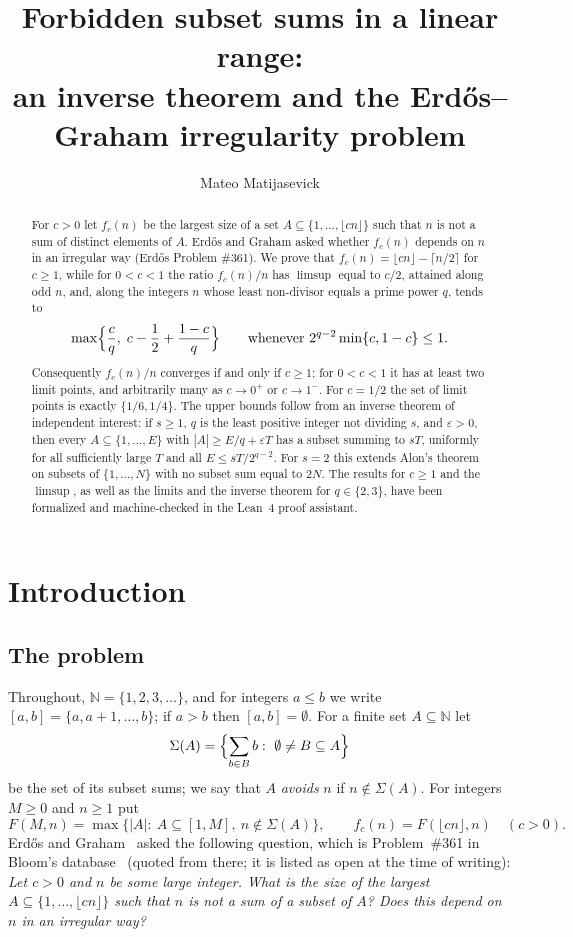 \documentclass[11pt,reqno]{amsart}
\title[Forbidden subset sums in a linear range]{Forbidden subset sums in a linear range:\\ an inverse theorem and the Erd\H{o}s--Graham irregularity problem}
\author{Mateo Matijasevick}
\date{}
\numberwithin{equation}{section}
\theoremstyle{definition}
\theoremstyle{remark}
\newcommand{\N}{\mathbb{N}}
\newcommand{\eps}{\varepsilon}
\newcommand{\card}[1]{\lvert #1\rvert}
\newcommand{\floor}[1]{\lfloor #1\rfloor}
\newcommand{\Sig}{\Sigma}
\begin{document}
\begin{abstract}
For $c>0$ let $f_c(n)$ be the largest size of a set $A\subseteq\{1,\dots,\lfloor cn\rfloor\}$ such that $n$ is not a sum of distinct elements of $A$. Erd\H{o}s and Graham asked whether $f_c(n)$ depends on $n$ in an irregular way (Erd\H{o}s Problem \#361). We prove that $f_c(n)=\lfloor cn\rfloor-\lceil n/2\rceil$ for $c\ge 1$, while for $0<c<1$ the ratio $f_c(n)/n$ has $\limsup$ equal to $c/2$, attained along odd $n$, and, along the integers $n$ whose least non-divisor equals a prime power $q$, tends to
\[
\max\Bigl\{\frac cq,\; c-\frac12+\frac{1-c}{q}\Bigr\}
\qquad\text{whenever } 2^{q-2}\min\{c,1-c\}\le 1 .
\]
Consequently $f_c(n)/n$ converges if and only if $c\ge1$; for $0<c<1$ it has at least two limit points, and arbitrarily many as $c\to0^+$ or $c\to1^-$. For $c=1/2$ the set of limit points is exactly $\{1/6,1/4\}$. The upper bounds follow from an inverse theorem of independent interest: if $s\ge1$, $q$ is the least positive integer not dividing $s$, and $\eps>0$, then every $A\subseteq\{1,\dots,E\}$ with $|A|\ge E/q+\eps T$ has a subset summing to $sT$, uniformly for all sufficiently large $T$ and all $E\le sT/2^{q-2}$. For $s=2$ this extends Alon's theorem on subsets of $\{1,\dots,N\}$ with no subset sum equal to $2N$. The results for $c\ge1$ and the $\limsup$, as well as the limits and the inverse theorem for $q\in\{2,3\}$, have been formalized and machine-checked in the Lean~4 proof assistant.
\end{abstract}

\maketitle

\section{Introduction}\label{sec:intro}

\subsection{The problem}
Throughout, $\N=\{1,2,3,\dots\}$, and for integers $a\le b$ we write $[a,b]=\{a,a+1,\dots,b\}$; if $a>b$ then $[a,b]=\emptyset$. For a finite set $A\subseteq\N$ let
\[
 \Sig(A)=\Bigl\{\sum_{b\in B}b:\ \emptyset\neq B\subseteq A\Bigr\}
\]
be the set of its subset sums; we say that $A$ \emph{avoids} $n$ if $n\notin\Sig(A)$. For integers $M\ge0$ and $n\ge1$ put
\[
 F(M,n)=\max\bigl\{\card A:\ A\subseteq[1,M],\ n\notin\Sig(A)\bigr\},
 \qquad
 f_c(n)=F(\floor{cn},n)\quad(c>0).
\]
Erd\H{o}s and Graham~\cite{EG80} asked the following question, which is Problem~\#361 in Bloom's database~\cite{Bl} (quoted from there; it is listed as open at the time of writing): \emph{Let $c>0$ and $n$ be some large integer. What is the size of the largest $A\subseteq\{1,\dots,\floor{cn}\}$ such that $n$ is not a sum of a subset of $A$? Does this depend on $n$ in an irregular way?}
\end{document}
